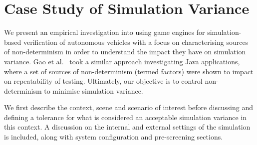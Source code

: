 \section{Case Study of Simulation Variance} \label{s:case-study}

We present an empirical investigation into using game engines for
simulation-based verification of autonomous vehicles with a focus on
characterising sources of non-determinism in order to understand  the impact
they have on simulation variance. 
%
Gao et al.~\cite{when-and-what-should-we-control} took a similar approach investigating Java applications, where a set of sources of non-determinism (termed factors) were shown to impact on repeatability of testing. Ultimately, our objective is to control non-determinism to minimise simulation variance.

We first describe the context, scene and scenario of interest before discussing and defining a tolerance for what is considered an acceptable simulation variance in this context. A discussion on the internal and external settings of the simulation is included, along with system configuration and pre-screening sections. 

